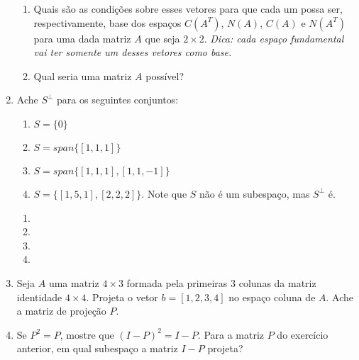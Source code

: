 \documentclass[leqno]{article}
\begin{document}
\begin{enumerate}
\begin{enumerate}

\item Quais são as condições sobre esses vetores para que cada um possa ser, respectivamente, base dos espaços $C(A^T)$, $N(A)$, $C(A)$ e $N(A^T)$ para uma dada matriz $A$ que seja $2 \times 2$. \textit{Dica: cada espaço fundamental vai ter somente um desses vetores como base.}

\begin{sol} 
\end{sol} 

\item Qual seria uma matriz $A$ possível?

\begin{sol} 
\end{sol} 

\end{enumerate}

\item Ache $S^{\perp}$ para os seguintes conjuntos:

\begin{enumerate}

\item $S = \{0\}$

\item $S = span\{[1,1,1]\}$

\item $S = span\{[1,1,1], [1,1,-1]\}$

\item $S = \{[1,5,1], [2,2,2]\}$. Note que $S$ não é um subespaço, mas $S^\perp$ é.

\end{enumerate}

\begin{sol}
	\vspace{-\baselineskip} 
	\begin{enumerate}    
		\item %
		\item %
		\item %
		\item %
	\end{enumerate}    
\end{sol} 

\item Seja $A$ uma matriz $4 \times 3$ formada pela primeiras 3 colunas da matriz identidade $4 \times 4$. Projeta o vetor $b = [1,2,3,4]$ no espaço coluna de $A$. Ache a matriz de projeção $P$.

\begin{sol} 
\end{sol} 

\item Se $P^2 = P$, mostre que $(I - P)^2 = I - P$. Para a matriz $P$ do exercício anterior, em qual subespaço a matriz $I - P$ projeta?

\begin{sol} 
\end{sol} 
\end{enumerate}
\end{document}
